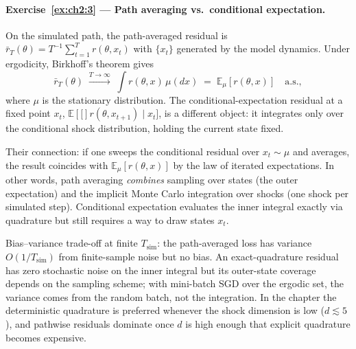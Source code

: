 \documentclass[11pt,a4paper]{report}
\newcommand{\E}[1]{\mathbb{E}\!\left[#1\right]}
\begin{document}
\paragraph{Exercise~\ref{ex:ch2:3} --- Path averaging vs.\ conditional expectation.}
On the simulated path, the path-averaged residual is $\bar r_T(\theta) = T^{-1}\sum_{t=1}^T r(\theta, x_t)$ with $\{x_t\}$ generated by the model dynamics.  Under ergodicity, Birkhoff's theorem gives
\[
   \bar r_T(\theta) \;\xrightarrow{T \to \infty}\; \int r(\theta, x)\,\mu(dx) \;=\; \mathbb{E}_\mu[r(\theta, x)] \quad\text{a.s.},
\]
where $\mu$ is the stationary distribution.  The conditional-expectation residual at a fixed point $x_t$, $\E[r(\theta, x_{t+1}) \mid x_t]$, is a different object: it integrates only over the conditional shock distribution, holding the current state fixed.

Their connection: if one sweeps the conditional residual over $x_t \sim \mu$ and averages, the result coincides with $\mathbb{E}_\mu[r(\theta, x)]$ by the law of iterated expectations.  In other words, path averaging \emph{combines} sampling over states (the outer expectation) and the implicit Monte Carlo integration over shocks (one shock per simulated step).  Conditional expectation evaluates the inner integral exactly via quadrature but still requires a way to draw states $x_t$.

Bias--variance trade-off at finite $T_{\text{sim}}$: the path-averaged loss has variance $O(1/T_{\text{sim}})$ from finite-sample noise but no bias.  An exact-quadrature residual has zero stochastic noise on the inner integral but its outer-state coverage depends on the sampling scheme; with mini-batch SGD over the ergodic set, the variance comes from the random batch, not the integration.  In the chapter the deterministic quadrature is preferred whenever the shock dimension is low ($d \lesssim 5$), and pathwise residuals dominate once $d$ is high enough that explicit quadrature becomes expensive.
\end{document}

